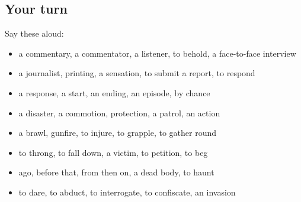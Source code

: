 \subsection*{Your turn}
Say these aloud:

\begin{itemize}
\raggedright
  \item a commentary, a commentator, a listener, to behold, a face-to-face interview
  \item a journalist, printing, a sensation, to submit a report, to respond
  \item a response, a start, an ending, an episode, by chance
  \item a disaster, a commotion, protection, a patrol, an action
  \item a brawl, gunfire, to injure, to grapple, to gather round
  \item to throng, to fall down, a victim, to petition, to beg
  \item ago, before that, from then on, a dead body, to haunt
  \item to dare, to abduct, to interrogate, to confiscate, an invasion
\end{itemize}

